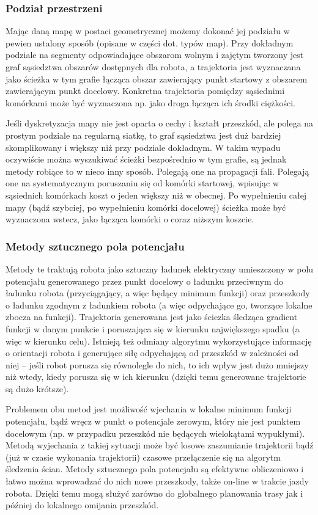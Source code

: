 \subsubsection{Podział przestrzeni}

Mając daną mapę w postaci geometrycznej możemy dokonać jej podziału w pewien ustalony
sposób (opisane w części dot. typów map). Przy dokładnym podziale na segmenty
odpowiadające obszarom wolnym i zajętym tworzony jest graf sąsiedztwa obszarów dostępnych
dla robota, a trajektoria jest wyznaczana jako ścieżka w tym grafie łącząca obszar
zawierający punkt startowy z obszarem zawierającym punkt docelowy. Konkretna trajektoria
pomiędzy sąsiednimi komórkami może być wyznaczona np. jako droga łącząca ich środki ciężkości.

Jeśli dyskretyzacja mapy nie jest oparta o cechy i kształt przeszkód, ale polega na
prostym podziale na regularną siatkę, to graf sąsiedztwa jest duż bardziej skomplikowany
i większy niż przy podziale dokładnym. W takim wypadu oczywiście można wyszukiwać
ścieżki bezpośrednio w tym grafie, są jednak metody robiące to w nieco inny sposób.
Polegają one na propagacji fali. Polegają one na systematycznym poruszaniu się
od komórki startowej, wpisując w sąsiednich komórkach koszt o jeden większy niż w obecnej.
Po wypełnieniu całej mapy (bądź szybciej, po wypełnieniu komórki docelowej) ścieżka
może być wyznaczona wstecz, jako łącząca komórki o coraz niższym koszcie.

\subsubsection{Metody sztucznego pola potencjału}

Metody te traktują robota jako sztuczny ładunek elektryczny umieszczony w polu potencjału
generowanego przez punkt docelowy o ładunku przeciwnym do ładunku robota
(przyciągający, a więc będący minimum funkcji) oraz przeszkody o ładunku zgodnym
z ładunkiem robota (a więc odpychające go, tworzące lokalne zbocza na funkcji).
Trajektoria generowana jest jako ściezka śledząca gradient funkcji w danym punkcie
i poruszająca się w kierunku największego spadku (a więc w kierunku celu). Istnieją
też odmiany algorytmu wykorzystujące informację o orientacji robota i generujące
siłę odpychającą od przeszkód w zależności od niej -- jeśli robot porusza się równolegle
do nich, to ich wpływ jest dużo mniejszy niż wtedy, kiedy porusza się w ich kierunku
(dzięki temu generowane trajektorie są dużo krótsze).

Problemem obu metod jest możliwość
wjechania w lokalne minimum funkcji potencjału, bądź wręcz w punkt o potencjale zerowym,
który nie jest punktem docelowym (np. w przypadku przeszkód nie będących wielokątami
wypukłymi). Metodą wyjechania z takiej sytuacji może być losowe zaszumianie trajektorii
bądź (już w czasie wykonania trajektorii) czasowe przełączenie się na algorytm śledzenia
ścian. Metody sztucznego pola potencjału są efektywne obliczeniowo i łatwo można wprowadzać
do nich nowe przeszkody, także on-line w trakcie jazdy robota. Dzięki temu mogą służyć
zarówno do globalnego planowania trasy jak i później do lokalnego omijania przeszkód.

